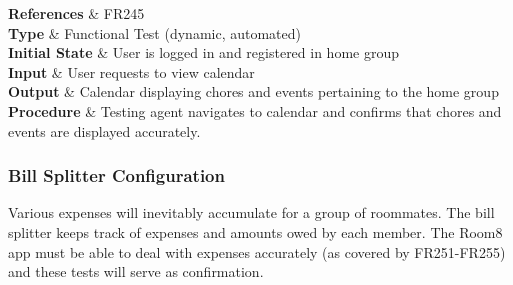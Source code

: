 \documentclass[12pt, titlepage]{article}
\begin{document}
\begin{center}
{    \textbf{References} & FR245 \\ 

    \textbf{Type} & Functional Test (dynamic, automated) \\ 

    \textbf{Initial State} & User is logged in and registered in home group \\ 

    \textbf{Input} & User requests to view calendar \\ 

    \textbf{Output} & Calendar displaying chores and events pertaining to the home group \\ 

    \textbf{Procedure} & Testing agent navigates to calendar and confirms that chores and events are displayed accurately. \\ 
  }

\end{center}

\subsubsection{Bill Splitter Configuration}
Various expenses will inevitably accumulate for a group of roommates. The bill splitter keeps track of expenses and amounts owed by each member. The Room8 app must be able to deal with expenses accurately (as covered by FR251-FR255) and these tests will serve as confirmation.
\end{document}
